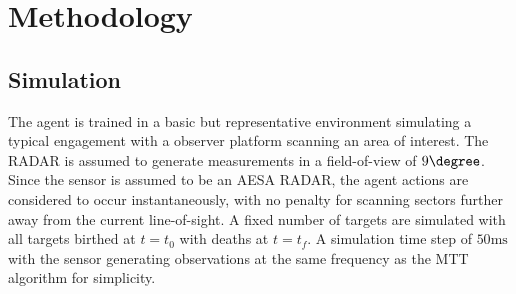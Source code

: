


\section{Methodology}
\label{sect:method}
\subsection{Simulation}
The agent is trained in a basic but representative environment simulating a typical engagement with a observer platform scanning an area of interest. The RADAR is assumed to generate measurements in a field-of-view of $9\degree$. Since the sensor is assumed to be an AESA RADAR, the agent actions are considered to occur instantaneously, with no penalty for scanning sectors further away from the current line-of-sight. A fixed number of targets are simulated with all targets birthed at $t=t_{0}$ with deaths at $t=t_{f}$. A simulation time step of $50\text{ms}$ with the sensor generating observations at the same frequency as the MTT algorithm for simplicity.

